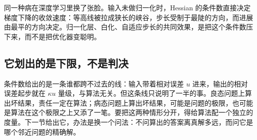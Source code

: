 同一种病在深度学习里换了张脸。输入未做归一化时，Hessian 的条件数直接决定梯度下降的收敛速度：等高线被拉成狭长的峡谷，步长受制于最陡的方向，而进展由最平的方向决定。归一化层、白化、自适应步长的共同效果，是把这个条件数压下来，而不是把优化器变聪明。

\subsection{它划出的是下限，不是判决}

条件数给出的是一条谁都跨不过去的线：输入带着相对误差 \(u\) 进来，输出的相对误差起步就在 \(\kappa u\) 量级，与算法无关。但这条线只说明了一半的事。良态问题上算出坏结果，责任一定在算法；病态问题上算出坏结果，可能是问题的极限，也可能是算法在这个极限之上又添了一笔。要把这两种情形分开，得给算法配一个独立的度量。下一节给出它，办法是换一个问法：不问算出的答案离真解多远，而问它是哪个邻近问题的精确解。
